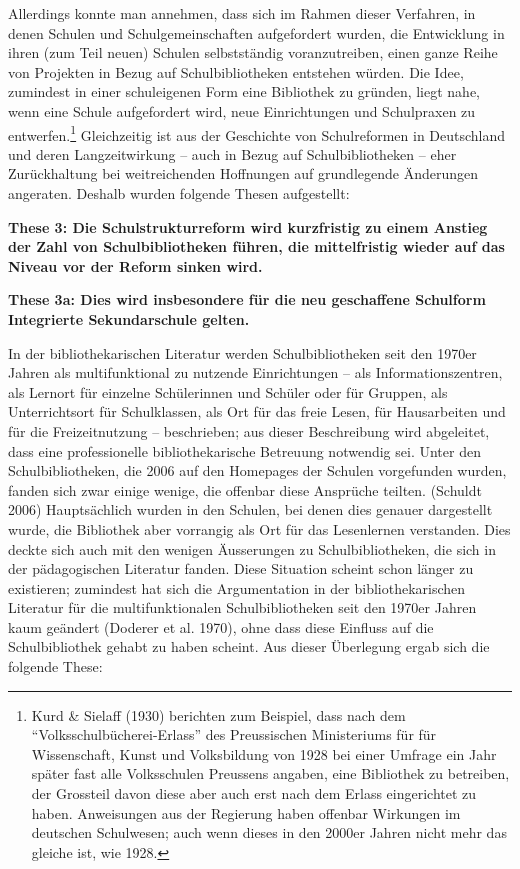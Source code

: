 \documentclass[a4paper,
fontsize=11pt,
oneside,
numbers=noperiodatend,
parskip=half-,
bibliography=totoc,
final
]{scrartcl}
\begin{document}
Allerdings konnte man annehmen, dass sich im Rahmen dieser Verfahren, in
denen Schulen und Schulgemeinschaften aufgefordert wurden, die
Entwicklung in ihren (zum Teil neuen) Schulen selbstständig
voranzutreiben, einen ganze Reihe von Projekten in Bezug auf
Schulbibliotheken entstehen würden. Die Idee, zumindest in einer
schuleigenen Form eine Bibliothek zu gründen, liegt nahe, wenn eine
Schule aufgefordert wird, neue Einrichtungen und Schulpraxen zu
entwerfen.\footnote{Kurd \& Sielaff (1930) berichten zum Beispiel, dass
  nach dem \enquote{Volksschulbücherei-Erlass} des Preussischen
  Ministeriums für für Wissenschaft, Kunst und Volksbildung von 1928 bei
  einer Umfrage ein Jahr später fast alle Volksschulen Preussens
  angaben, eine Bibliothek zu betreiben, der Grossteil davon diese aber
  auch erst nach dem Erlass eingerichtet zu haben. Anweisungen aus der
  Regierung haben offenbar Wirkungen im deutschen Schulwesen; auch wenn
  dieses in den 2000er Jahren nicht mehr das gleiche ist, wie 1928.}
Gleichzeitig ist aus der Geschichte von Schulreformen in Deutschland und
deren Langzeitwirkung -- auch in Bezug auf Schulbibliotheken -- eher
Zurückhaltung bei weitreichenden Hoffnungen auf grundlegende Änderungen
angeraten. Deshalb wurden folgende Thesen aufgestellt:

\textbf{These 3: Die Schulstrukturreform wird kurzfristig zu einem Anstieg der
Zahl von Schulbibliotheken führen, die mittelfristig wieder auf das
Niveau vor der Reform sinken wird.}

\textbf{These 3a: Dies wird insbesondere für die neu geschaffene Schulform
Integrierte Sekundarschule gelten.}

In der bibliothekarischen Literatur werden Schulbibliotheken seit den
1970er Jahren als multifunktional zu nutzende Einrichtungen -- als
Informationszentren, als Lernort für einzelne Schülerinnen und Schüler
oder für Gruppen, als Unterrichtsort für Schulklassen, als Ort für das
freie Lesen, für Hausarbeiten und für die Freizeitnutzung --
beschrieben; aus dieser Beschreibung wird abgeleitet, dass eine
professionelle bibliothekarische Betreuung notwendig sei. Unter den
Schulbibliotheken, die 2006 auf den Homepages der Schulen vorgefunden
wurden, fanden sich zwar einige wenige, die offenbar diese Ansprüche
teilten. (Schuldt 2006) Hauptsächlich wurden in den Schulen, bei denen
dies genauer dargestellt wurde, die Bibliothek aber vorrangig als Ort
für das Lesenlernen verstanden. Dies deckte sich auch mit den wenigen
Äusserungen zu Schulbibliotheken, die sich in der pädagogischen
Literatur fanden. Diese Situation scheint schon länger zu existieren;
zumindest hat sich die Argumentation in der bibliothekarischen Literatur
für die multifunktionalen Schulbibliotheken seit den 1970er Jahren kaum
geändert (Doderer et al. 1970), ohne dass diese Einfluss auf die
Schulbibliothek gehabt zu haben scheint. Aus dieser Überlegung ergab
sich die folgende These:
\end{document}
